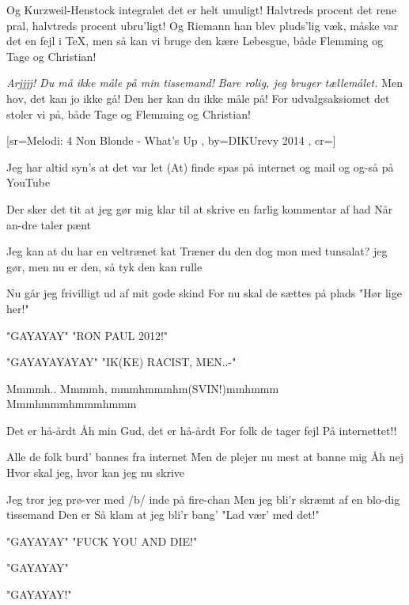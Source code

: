 \documentclass[pdftex,12pt]{article}
\begin{document}
\begin{songs}{}
\endverse
\beginverse
Og Kurzweil-Henstock integralet
det er helt umuligt!
Halvtreds procent det rene pral,
halvtreds procent ubru’ligt!
Og Riemann han blev pluds’lig væk,
måske var det en fejl i \TeX,
men så kan vi bruge den kære Lebesgue,
både Flemming og Tage og Christian!

\endverse
\beginverse
[Siges:] \emph{Arjjjj! Du må ikke måle på min tissemand!}
\emph{Bare rolig, jeg bruger tællemålet.}
Men hov, det kan jo ikke gå!
Den her kan du ikke måle på!
For udvalgsaksiomet det stoler vi på,
både Tage og Flemming og Christian!

\endverse
\endsong



[sr={Melodi: 4 Non Blonde - What's Up}
,
by={DIKUrevy 2014}
,
cr={}]\hypertarget{Internetdiskurs}{}
\label{song46}

\beginverse
Jeg har altid syn's at det var let
(At) finde spas på internet
og mail
og og-så på YouTube

\endverse
\beginverse
Der sker det tit   at jeg gør mig klar
til at skrive en   farlig kommentar
af had
Når an-dre taler pænt

\endverse
\beginverse
  Jeg kan at du har en veltrænet kat
Træner du den dog mon med tunsalat?
jeg gør, men nu er den, så tyk den kan rulle

\endverse
\beginverse
Nu går jeg frivilligt ud af mit gode skind
For nu
skal de sættes på plads
"Hør lige her!"

\endverse
\beginverse
"GAYAYAY"
"RON PAUL 2012!"

\endverse
\beginverse
"GAYAYAYAYAY"
"IK(KE) RACIST, MEN..-"

\endverse
\beginverse
Mmmmh..
Mmmmh, mmmhmmmhm(SVIN!)mmhmmm
Mmmhmmmhmmmhmmm

\endverse
\beginverse
Det er hå-årdt
Åh min Gud, det er hå-årdt
For folk de tager fejl
På internettet!!

Alle de folk burd' bannes  fra   internet
Men de plejer nu mest at banne mig
Åh nej
  Hvor skal jeg, hvor kan jeg nu skrive

\endverse
\beginverse
Jeg tror jeg prø-ver med /b/ inde på fire-chan
Men jeg bli'r skræmt af en blo-dig tissemand
Den er
 Så klam at jeg bli'r bang'
"Lad vær' med det!"

\endverse
\beginverse
"GAYAYAY"
"FUCK YOU AND DIE!"

\endverse
\beginverse
"GAYAYAY"

\endverse
\beginverse
"GAYAYAY!"


\end{songs}
\end{document}
